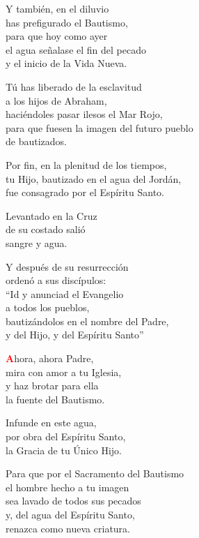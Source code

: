 \documentclass[12pt, letterpaper]{report}
\begin{document}
\noindent
Y tambi\'en, en el diluvio\\ 
has prefigurado el Bautismo,\\ 
para que hoy como ayer\\ 
el agua se\~nalase el fin del pecado\\ 
y el inicio de la Vida Nueva.

\noindent
T\'u has liberado de la esclavitud\\ 
a los hijos de Abraham,\\ 
haci\'endoles pasar ilesos el Mar Rojo,\\ 
para que fuesen la imagen del futuro pueblo\\ 
de bautizados.

\noindent
Por fin, en la plenitud de los tiempos,\\ 
tu Hijo, bautizado en el agua del Jord\'an, \\ 
fue consagrado por el Esp\'iritu Santo.

\noindent
Levantado en la Cruz\\ 
de su costado sali\'o\\ 
sangre y agua.

\noindent
Y despu\'es de su resurrecci\'on\\ 
orden\'o a sus disc\'ipulos:\\ 
``Id y anunciad el Evangelio\\ 
a todos los pueblos,\\ 
bautiz\'andolos en el nombre del Padre,\\ 
y del Hijo, y del Esp\'iritu Santo''

\newpage

\lettrine[lines=1]{\bfseries \textcolor{red}{A}}{}\Large{hora, ahora Padre,\\ 
mira con amor a tu Iglesia,\\ 
y haz brotar para ella\\ 
la fuente del Bautismo.}

\noindent
Infunde en este agua,\\ 
por obra del Esp\'iritu Santo,\\ 
la Gracia de tu \'Unico Hijo.

\noindent
Para que por el Sacramento del Bautismo\\ 
el hombre hecho a tu imagen\\ 
sea lavado de todos sus pecados\\ 
y, del agua del Esp\'iritu Santo,\\ 
renazca como nueva criatura.
\end{document}
